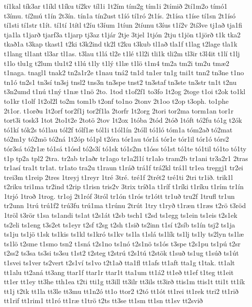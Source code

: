 {tí1kal
tík3ar
t1íkl
t1íku
tí2kv
tíl1i
1t2ím
tím2g
tím1i
2tímið
2tí1m2o
tímó1
t3ímu.
tí2mú
t1ín
2t3ín.
tín1a
tín2ust
t1íó
tí1ró
2t1ís.
2t1ísa
t1íse
tí1sn
2t1ísó
tí1sti
tí1str
t1ít.
tí1tí
1títl
t2íu
t3íum
1tíun
2tíunu
t3íus
t1í2v
2tí3ve
tj1að
tja1fi
tja1la
t1jarð
tjarf3a
t1jarp
tj3az
t1jár
2tje
3tjel
1tjón
2tju
t1jön
t1jörð
t1k
tka2
tkað1a
t3kap
tkast1
t2ki
t3k2ind
tk2l
t2ku
t3kub
tl1að
tla1f
t1lag
t2lage
tla1k
t1lang
tl1ant
tl3ar
tl1as.
t3lau
t1lá
tl2e
t1lé
t1l2i
tli1k
tli2m
tl3ir
t3l4it
t1lí
t1lj
t1lo
tlu1g
t2lum
tlu1t2
t1lú
t1ly
t1lý
t1læ
t1lö
t1m4
tm2a
tm2i
tm2u
tmæ2
t1naga.
tnagl1
tnak2
tn2a1r2e
t1nau
tná2
tn1d
tn1er
tn1g
tni1t
tnn2
tn3ne
t1no
tn1ó
tn2s1
tn3sí
tn3sj
tnsl2
tns3n
tn3spe
tnst2
tn3staf
tn3ste
tn3str
tn1t
t2nu
t3n2umd
t1nú
t1ný
t1næ
t1nö
2to.
1tod
t1of2f1
to3fo
1t2og
2toge
t1oi
t2ok
to1kl
to1kr
t1olf
1t2ol2l
to2m
tom1b
t2onf
to1no
2tonv
2t1oo
t2op
t3oph.
to1phe
2t1or.
t1orðu
1t2orf
tor2f1j
tor2f1la
2torfr
1t2org
2tori
tor2ma
torm1an
tor1r
tort3i
tosk3
1tot
2to1t2e
2totö
2tov
1t2ox
1tóba
2tód
2tóð
1tóft
tó2fu
tó1g
t2ók
tó1kí
tók2s
tó1lau
tól2f
tólf1æ
tól1i
t1ól1ín
2tóll
tó1ló
tóm1a
tóm2að
tó2mat
tó2m1y
tó2mö
tó2ná
1t2óp
tó1pl
t2óra
tór1au
tór1á
tór1e
tór1il
tór1ó
tórs2
tór3sá
tó2r1æ
tó1sá
t1ósd
tó2s3í
tó1sk
tó1s2m
t1óss
tó1st
tó1te
tó1til
tó1to
tó1ty
t1p
tp2a
tpl2
2tra.
tr2ab
tr1aðr
tr1ago
tr1a2l1í
tr1alo
tram2b
tr1ani
tr3a2r1
2tras
tr1así
tra1t
tr1at.
tr1ato
tra2u
t1raun
t1ráð
trá1f
trá2kl
trá1l
tr1ea
treggj1
tr2ei
trei3m
t1reip
2tres
1treyj
t1reyr
1tré
3tré.
tré1f
2trét2
tré1ti
2tri
tr1ið.
trik1l
t2riku
tri1ma
tr2ind
t2rip
t1risn
tris2v
3trix
tríð1a
t1ríf
t1ríki
t1ríku
t1rím
tr1ín
1trjó
1troð
1trog.
tr1oj
2t1róf
3tról
tr1ón
t1rós
tr1ótt
tr1uð
tru2f
1trufl
tr1un
tr2unn
1trú
trú1f2
trú3fu
trú1ma
t1rúnu
2trút
1try
t1ryð
t1ræn
t1ræs
t2rö
t3röd
1tröl
t3rör
t1sa
ts1andi
ts1at
t2s1át
t2sb
tsch1
t2sd
ts1egg
ts1ein
ts1eis
t2s1ek
ts2eli
ts1eng
t3s2et
ts1eyr
t2sf
t2sg
t2sh
t1sið
ts2inn
t1sí
t2síb
ts1ín
tsj2
ts1ja
ts1ju
ts1jö
t1sk
ts1kis
ts1kl
ts1kró
ts1kv
ts1la
t1slá
ts1lík
ts1lj
ts1ly
ts2lyn
ts1læ
ts1lö
t2sme
t1smo
tsn2
t1sná
t2s1no
ts1nó
t2s1nö
ts1ós
t3spe
t2s1pu
ts1pú
t2sr
t2ss2
ts3sa
ts3si
ts3su
t1st2
t2steg
t2strú
t2s1tú
t2stök
t1suð
ts1ug
t1súð
ts1út
t1svei
ts1ver
ts2vert
t2s1ví
ts1vo
t2t1að
tta1fl
tt1afs
tt1aft
tta1g
t1tak.
tt1alt
tt1alu
tt2aná
tt3ang
ttar1f
ttar1r
ttar1t
tta1um
tt1á2
tt1eð
tt1ef
t1teg
tt1eit
tt1er
tt1ey
tt3he
tth1ea
t2ti
tti1g
tt3ill
tt3ilr
tt3ils
tt3irð
ttis1m
ttis1t
tti1t
tt1ík
tt1j
t2tk
tt1la
tt3le
tt3mu
tt1n2ó
tt1o
ttor2
t2tó
tt1ót
tt1rei
tt1rek
ttri2
tt1rið
tt1rif
tt1rim1
tt1ró
tt1ræ
t1trö
t2ts
tt3se
tt1sm
tt1sn
tt1sv
tt2svið
}
